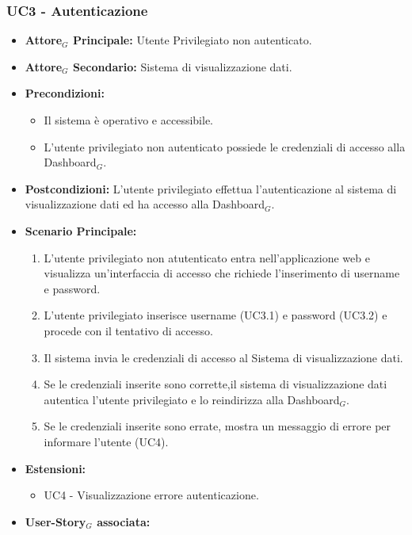 \documentclass[11pt]{article}
\begin{document}
\begin{justify}
\subsubsection{\textbf{UC3 - Autenticazione}}
\begin{itemize}
     \item \textbf{Attore$_G$ Principale:} Utente Privilegiato non autenticato.
     \item \textbf{Attore$_G$ Secondario:} Sistema di visualizzazione dati.
     \item \textbf{Precondizioni:}
        \begin{itemize}
            \item Il sistema è operativo e accessibile.
            \item L'utente privilegiato non autenticato possiede le credenziali di accesso alla Dashboard$_G$.
        \end{itemize}
     \item \textbf{Postcondizioni:} L'utente privilegiato effettua l'autenticazione al sistema di visualizzazione dati ed ha accesso alla Dashboard$_G$.
     \item \textbf{Scenario Principale:}
        \begin{enumerate}
            \item L'utente privilegiato non atutenticato entra nell'applicazione web e visualizza un'interfaccia di accesso che richiede l'inserimento di username e password.
            \item L'utente privilegiato inserisce username (UC3.1) e password (UC3.2) e procede con il tentativo di accesso.
            \item Il sistema invia le credenziali di accesso al Sistema di visualizzazione dati.
            \item Se le credenziali inserite sono corrette,il sistema di visualizzazione dati autentica l’utente privilegiato e lo reindirizza alla Dashboard$_G$.
            \item Se le credenziali inserite sono errate, mostra un messaggio di errore per informare l’utente (UC4).
        \end{enumerate}
     \item \textbf{Estensioni:}
        \begin{itemize}
            \item UC4 - Visualizzazione errore autenticazione.
        \end{itemize}
     \item \textbf{User-Story$_G$ associata:}

\end{itemize}
\end{justify}
\end{document}

